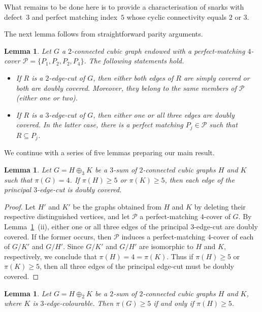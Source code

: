 \documentclass[a4paper]{amsart}
\theoremstyle{plain}
\newtheorem{lemma}[theorem]{Lemma}
\theoremstyle{definition}
\begin{document}
What remains to be done here is to provide a characterisation
of snarks with defect~$3$ and perfect matching index~$5$ whose
cyclic connectivity equals $2$ or $3$.

\medskip

The next lemma follows from straightforward parity arguments.

\begin{lemma}\label{lem:pmc-2+3cuts}
Let $G$ a $2$-connected cubic graph endowed with a
perfect-matching $4$-cover $\mathcal{P}=\{P_1,P_2,P_2,P_4\}$.
The following statements hold.
\begin{itemize}
\item[{\rm (i)}] If $R$ is a $2$-edge-cut of $G$, then
    either both edges of $R$ are simply covered or both are
    doubly covered. Moreover, they belong to the same
    members of $\mathcal{P}$ (either one or two).

\item[{\rm (ii)}] If $R$ is a $3$-edge-cut of $G$, then
    either one or all three edges are doubly covered. In
    the latter case, there is a perfect matching
    $P_j\in\mathcal{P}$ such that $R\subseteq P_j$.
\end{itemize}
\end{lemma}

We continue with a series of five lemmas preparing our main
result.

\begin{lemma}\label{lem:3cut4cover}
Let $G=H\oplus_3 K$ be a $3$-sum of $2$-connected cubic graphs
$H$ and $K$ such that $\pi(G)=4$. If $\pi(H)\geq 5$ or
$\pi(K)\geq 5$, then each edge of the principal $3$-edge-cut is
doubly covered.
\end{lemma}

\begin{proof}
Let $H'$ and $K'$ be the graphs obtained from $H$ and $K$ by
deleting their respective distinguished vertices, and let
$\mathcal{P}$ a perfect-matching $4$-cover of $G$. By
Lemma~\ref{lem:pmc-2+3cuts}~(ii), either one or all three edges
of the principal $3$-edge-cut are doubly covered. If the former
occurs, then $\mathcal{P}$ induces a perfect-matching $4$-cover
of each of $G/K'$ and $G/H'$. Since $G/K'$ and $G/H'$ are
isomorphic to $H$ and $K$, respectively, we conclude that
$\pi(H)=4=\pi(K)$. Thus if $\pi(H)\ge 5$ or $\pi(K)\ge 5$, then
all three edges of the principal edge-cut must be doubly
covered.
\end{proof}

\begin{lemma}\label{lem:2sum}
Let $G=H\oplus_2 K$ be a $2$-sum of $2$-connected cubic graphs
$H$ and $K$, where $K$ is $3$-edge-colourable. Then $\pi(G)\ge
5$ if and only if $\pi(H)\ge 5$.
\end{lemma}
	
\end{document}
